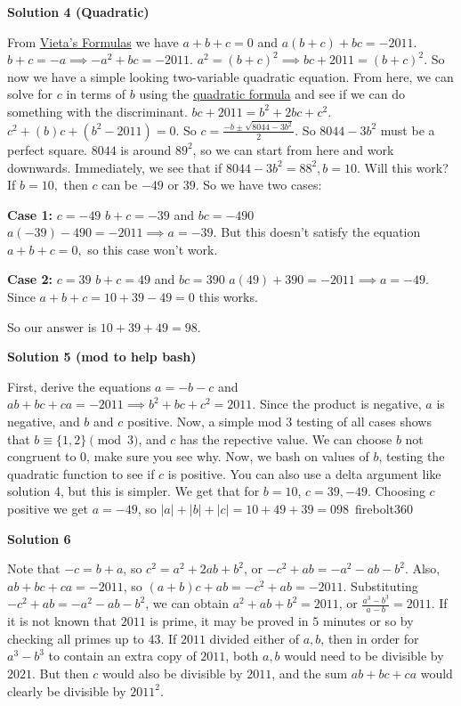 \begin{enumerate}
\textbf{Solution 4 (Quadratic)}

From \href{https://artofproblemsolving.com/wiki/index.php?title=Vieta\%27s\_Formulas}{Vieta's Formulas} we have $a + b + c = 0$ and $a(b + c) + bc = -2011.$ $b + c = -a \implies -a^2 + bc = -2011.$ $a^2 = (b + c)^2 \implies bc + 2011 = (b + c)^2.$  So now we have a simple looking two-variable quadratic equation. From here, we can solve for $c$ in terms of $b$ using the \href{https://artofproblemsolving.com/wiki/index.php?title=Quadratic\_formula}{quadratic formula} and see if we can do something with the discriminant. $bc + 2011 = b^2 + 2bc + c^2.$ $c^2 + (b)c + (b^2 - 2011) = 0.$ So $c = \frac{-b \pm \sqrt{8044 - 3b^2}}{2}.$ So $8044 - 3b^2$ must be a perfect square. $8044$ is around $89^2$, so we can start from here and work downwards. Immediately, we see that if $8044 - 3b^2 = 88^2, b = 10.$ Will this work? If $b = 10,$ then $c$ can be $-49$ or $39$. So we have two cases: 

 
\textbf{Case 1:} $c = -49$
$b + c = -39$ and $bc = -490$
$a(-39) - 490 = -2011 \implies a = -39.$ But this doesn't satisfy the equation $a + b + c = 0,$ so this case won't work.

 
\textbf{Case 2:} $c = 39$
$b + c = 49$ and $bc = 390$
$a(49) + 390 = -2011 \implies a = -49.$ Since $a + b + c = 10 + 39 - 49 = 0$ this works.

 So our answer is $10 + 39 + 49 = \boxed{98}.$




\textbf{Solution 5 (mod to help bash)}

First, derive the equations $a=-b-c$ and $ab+bc+ca=-2011\implies b^2+bc+c^2=2011$. Since the product is negative, $a$ is negative, and $b$ and $c$ positive. Now, a simple mod 3 testing of all cases shows that $b\equiv \{1,2\} \pmod{3}$, and $c$ has the repective value. We can choose $b$ not congruent to 0, make sure you see why. Now, we bash on values of $b$, testing the quadratic function to see if $c$ is positive. You can also use a delta argument like solution 4, but this is simpler. We get that for $b=10$, $c=39, -49$. Choosing $c$ positive we get $a=-49$, so $|a|+|b|+|c|=10+49+39=\boxed{098}$~firebolt360

 



\textbf{Solution 6}

Note that $-c=b+a$, so $c^2=a^2+2ab+b^2$, or $-c^2+ab=-a^2-ab-b^2$. Also, $ab+bc+ca=-2011$, so $(a+b)c+ab=-c^2+ab=-2011$. Substituting $-c^2+ab=-a^2-ab-b^2$, we can obtain $a^2+ab+b^2=2011$, or $\frac{a^3-b^3}{a-b}=2011$. If it is not known that $2011$ is prime, it may be proved in $5$ minutes or so by checking all primes up to $43$. If $2011$ divided either of $a, b$, then in order for $a^3-b^3$ to contain an extra copy of $2011$, both $a, b$ would need to be divisible by $2021$. But then $c$ would also be divisible by $2011$, and the sum $ab+bc+ca$ would clearly be divisible by $2011^2$. 


\end{enumerate}
